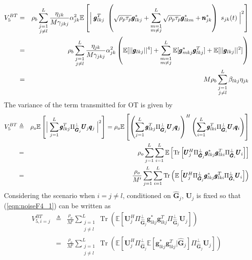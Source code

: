 \documentclass[10pt, a4paper, twoside,fleqn]{article}
\DeclareMathOperator{\Tr}{Tr}
\begin{document}
\begin{eqnarray}
V_5^{BT} &=& \rho_b\sum_{\substack{j=1 \\ j \neq l}}^{L}\frac{\eta_{jk}}{M\gamma_{jkj}}\alpha_{jk}^2\mathbb{E}\left[\Bigm| \pmb{g}_{lkj}^T \ \left(\sqrt{\rho_p\tau_p}\pmb{g}^*_{lkj}
                          			 +\sum_{\substack{m=1 \\ m \neq j}}^{L} \sqrt{\rho_p\tau_p}\pmb{g}^*_{lkm}
             			   			 +\pmb{n}^*_{jk}\right) 
             			   	\ s_{jk} (t)\Bigm|^2\right] \nonumber \\
         &=& \rho_b\sum_{\substack{j=1 \\ j \neq l}}^{L}\frac{\eta_{jk}}{M\gamma_{jkj}}\alpha_{jk}^2\left(\mathbb{E}[||\pmb{g}_{lkj}||^4] + \sum\limits_{\substack{m=1 \\ m\neq j}}^{L}\mathbb{E}[\pmb{g}^*_{mkj}\pmb{g}^T_{lkj}]+\mathbb{E}[||\pmb{g}_{lkj}||^2]\right) \nonumber \\
    &=& M\rho_b\sum\limits_{\substack{j=1 \\ j \neq l}}^{L}\beta_{lkj}\eta_{jk}
\end{eqnarray}
The variance of the term transmitted for OT is given by
\begin{eqnarray}\label{eqn:noiseF4_1}
	V_5^{BT} &\triangleq& \rho_o\mathbb{E}\left[\Bigm|\sum_{j=1}^{L}\pmb{g}_{lkj}^T\Pi^{\perp}_{{\hat{\pmb{G}}_j}}\pmb{U}_j \pmb{q}_{j}\Bigm|^2\right] = \rho_o\mathbb{E}\left[\left(\sum_{j=1}^{L}\pmb{g}_{lkj}^T\Pi^{\perp}_{{\hat{\pmb{G}}_j}}\pmb{U}_j \pmb{q}_{j}\right)^H\left(\sum_{i=1}^{L}\pmb{g}_{lki}^T\Pi^{\perp}_{{\hat{\pmb{G}}_i}}\pmb{U}_i \pmb{q}_{i}\right)\right]  \nonumber \\
	        &=& \rho_o\sum\limits_{j=1}^{L}\sum\limits_{i=1}^{L}\mathbb{E}\left[\Tr\left[\pmb{U}_j^H \Pi^{\perp}_{\pmb{\hat{G}}_j} \pmb{g}_{lkj}^* \pmb{g}_{lki}^{T}\Pi^{\perp}_{\pmb{\hat G}_i} \pmb{U}_i\right]\right]\nonumber \\	    
            &=&       \frac{\rho_o}{M'}\sum_{j=1}^{L}\sum_{i=1}^{L} \Tr\left(\mathbb{E}\left[\pmb{U}_j^H \Pi^{\perp}_{\pmb{\hat{G}}_j} \pmb{g}_{lkj}^* \pmb{g}_{lki}^{T}\Pi^{\perp}_{\pmb{\hat G}_i} \pmb{U}_i\right]\right)
\end{eqnarray}
Considering the scenario when $i=j\neq l$, conditioned on $\pmb{\hat G}_j$, $\pmb{U}_j$ is fixed so that
(\ref{eqn:noiseF4_1}) can be written as 
\begin{eqnarray}\label{eqn:v6m}
V_{5,i=j}^{BT}&\triangleq& \frac{\rho_o}{M'}\sum\limits_{\substack{j=1 \\ j \neq l}}^{L} \Tr\left(\mathbb{E}\left[\pmb{U}_j^H \Pi^{\perp}_{\pmb{\hat{G}}_j} \pmb{g}_{lkj}^* \pmb{g}_{lkj}^{T}\Pi^{\perp}_{\pmb{\hat G}_j} \pmb{U}_j \right]\right) \nonumber \\
           &=& \frac{\rho_o}{M'}\sum_{\substack{j=1 \\ j \neq l}}^{L}\Tr\left(\mathbb{E}\left[\pmb{U}_j^H \Pi^{\perp}_{\pmb{\hat{G}}_j} \mathbb{E}[\pmb{g}_{lkj}^* \pmb{g}_{lkj}^{T} | \pmb{\hat G}_j]\Pi^{\perp}_{\pmb{\hat G}_j} \pmb{U}_j \right]\right)
\end{eqnarray}
\end{document}
